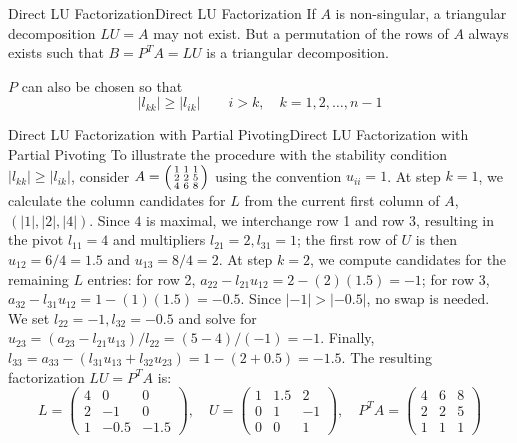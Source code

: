 \documentclass[../main.tex]{subfiles}
\begin{document}
\begin{theorem}{Direct LU Factorization}{Direct LU Factorization}
	If $A$ is non-singular, a triangular decomposition $LU = A$ may not exist. But a permutation of the rows of $A$ always exists such that $B = P^T A = L U$ is a triangular decomposition.

	$P$ can also be chosen so that
	\begin{equation*}
		| l_{kk} | \geq | l_{ik} | \qquad i > k, \quad k = 1, 2, \ldots, n-1
	\end{equation*}
\end{theorem}

\begin{example}{Direct LU Factorization with Partial Pivoting}{Direct LU Factorization with Partial Pivoting}
	To illustrate the procedure with the stability condition $|l_{kk}| \geq |l_{ik}|$, consider $A = \begin{psmallmatrix} 1 & 1 & 1 \\ 2 & 2 & 5 \\ 4 & 6 & 8 \end{psmallmatrix}$ using the convention $u_{ii}=1$. At step $k=1$, we calculate the column candidates for $L$ from the current first column of $A$, $(|1|, |2|, |4|)$. Since $4$ is maximal, we interchange row 1 and row 3, resulting in the pivot $l_{11}=4$ and multipliers $l_{21}=2, l_{31}=1$; the first row of $U$ is then $u_{12}=6/4=1.5$ and $u_{13}=8/4=2$. At step $k=2$, we compute candidates for the remaining $L$ entries: for row 2, $a_{22}-l_{21}u_{12} = 2-(2)(1.5)=-1$; for row 3, $a_{32}-l_{31}u_{12} = 1-(1)(1.5)=-0.5$. Since $|-1| > |-0.5|$, no swap is needed. We set $l_{22}=-1, l_{32}=-0.5$ and solve for $u_{23} = (a_{23}-l_{21}u_{13})/l_{22} = (5-4)/(-1) = -1$. Finally, $l_{33} = a_{33}-(l_{31}u_{13}+l_{32}u_{23}) = 1-(2+0.5)=-1.5$. The resulting factorization $LU = P^T A$ is:
	\begin{equation*}
		L = \begin{pmatrix} 4 & 0 & 0 \\ 2 & -1 & 0 \\ 1 & -0.5 & -1.5 \end{pmatrix}, \quad U = \begin{pmatrix} 1 & 1.5 & 2 \\ 0 & 1 & -1 \\ 0 & 0 & 1 \end{pmatrix}, \quad P^T A = \begin{pmatrix} 4 & 6 & 8 \\ 2 & 2 & 5 \\ 1 & 1 & 1 \end{pmatrix}
	\end{equation*}
\end{example}
\end{document}
